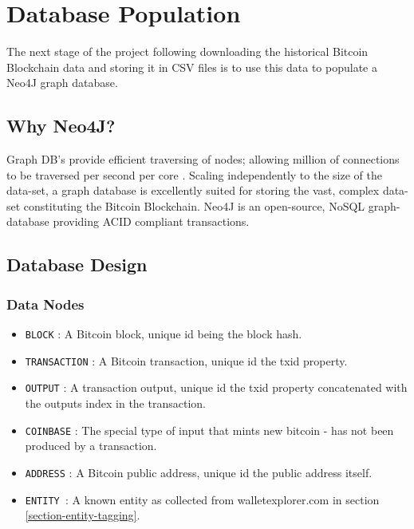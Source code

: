 \section{Database Population}\label{section-blockchain-import}
The next stage of the project following downloading the historical Bitcoin Blockchain data and storing it in CSV files is to use this data to populate a Neo4J graph database. 

\subsection{Why Neo4J?}
Graph DB's provide efficient traversing of nodes; allowing million of connections to be traversed per second per core \cite{RefWorks:doc:5c98f0c6e4b00cbb4da393d8}. Scaling independently to the size of the data-set, a graph database is excellently suited for storing the vast, complex data-set constituting the Bitcoin Blockchain. Neo4J is an open-source, NoSQL graph-database providing ACID compliant transactions.

\subsection{Database Design}

\subsubsection{Data Nodes}
\begin{itemize}
    \item \texttt{BLOCK} : A Bitcoin block, unique id being the block hash. 
    \item \texttt{TRANSACTION} : A Bitcoin transaction, unique id the txid property.
    \item \texttt{OUTPUT} : A transaction output, unique id the txid property concatenated with the outputs index in the transaction.
    \item \texttt{COINBASE} : The special type of input that mints new bitcoin - has not been produced by a transaction. 
    \item \texttt{ADDRESS} : A Bitcoin public address, unique id the public address itself.
    \item \texttt{ENTITY }: A known entity as collected from walletexplorer.com in section \ref{section-entity-tagging}. 
\end{itemize}

